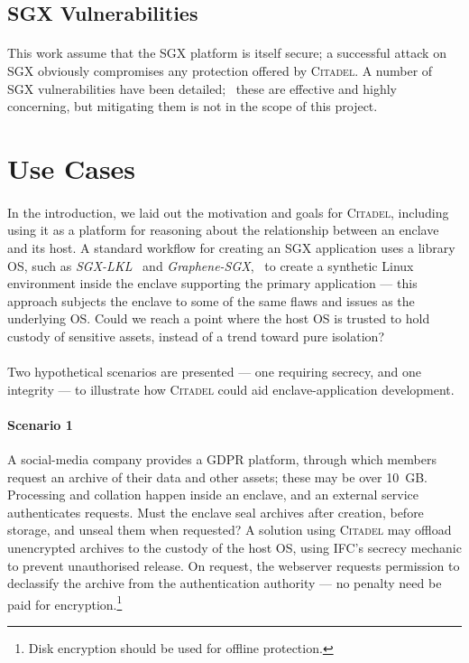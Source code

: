 \subsection{SGX Vulnerabilities}
\label{sec:sgx-vulnerabilities}
\paragraph{} This work assume that the SGX platform is itself secure; a successful attack on SGX obviously compromises any protection offered by \textsc{Citadel}. A number of SGX vulnerabilities have been detailed;~\cite{lipp2018meltdown, vanbulck2018foreshadow, Schwarz2019ZombieLoad, ridl, vanbulck2020lvi} these are effective and highly concerning, but mitigating them is not in the scope of this project.

\section{Use Cases}

\paragraph{} In the introduction, we laid out the motivation and goals for \textsc{Citadel}, including using it as a platform for reasoning about the relationship between an enclave and its host. A standard workflow for creating an SGX application uses a library OS, such as \textit{SGX-LKL}~\cite{priebe2019sgxlkl} and \textit{Graphene-SGX},~\cite{203255} to create a synthetic Linux environment inside the enclave supporting the primary application --- this approach subjects the enclave to some of the same flaws and issues as the underlying OS. Could we reach a point where the host OS is trusted to hold custody of sensitive assets, instead of a trend toward pure isolation?

\paragraph{} Two hypothetical scenarios are presented --- one requiring secrecy, and one integrity --- to illustrate how \textsc{Citadel} could aid enclave-application development.

\paragraph{Scenario 1} A social-media company provides a GDPR platform, through which members request an archive of their data and other assets; these may be over 10~GB. Processing and collation happen inside an enclave, and an external service authenticates requests. Must the enclave seal archives after creation, before storage, and unseal them when requested? A solution using \textsc{Citadel} may offload unencrypted archives to the custody of the host OS, using IFC's secrecy mechanic to prevent unauthorised release. On request, the webserver requests permission to declassify the archive from the authentication authority --- no penalty need be paid for encryption.\footnote{Disk encryption should be used for offline protection.}



